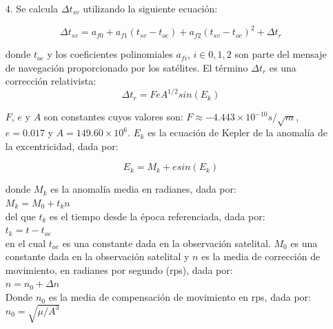 {\begin{itemize}
donde $c$ es la velocidad de la luz: $c \approx 2.998 \times 10^{8} ms^{-1}$.

\item[4.] Se calcula $\Delta t_{sv}$ utilizando la siguiente ecuación:

\begin{equation}
\label{Eq:Deltat_sv}
\Delta t_{sv}= a_{f0} + a_{f1}(t_{sv}-t_{oc}) + a_{f2}(t_{sv}-t_{oc})^2 + \Delta t_{r}
\end{equation}

donde $t_{oc}$ y los coeficientes polinomiales $a_{fi}$, $i \in {0, 1, 2}$ son parte del mensaje de navegación proporcionado por los satélites. El término $\Delta t_{r}$ es una corrección relativista:\\

\begin{equation}
\label{Eq:Deltat_r}
\Delta t_r = FeA^{1/2}sin(E_{k})
\end{equation}

$F$, $e$ y $A$ son constantes cuyos valores son: $F \approx -4.443 \times 10^{-10} s/\sqrt{m}$, $e = 0.017$ y $A = 149.60 \times 10^{6}$. $E_{k}$ es la ecuación de Kepler de la anomalía de la excentricidad, dada por:

\begin{equation}
\label{Eq:Kepler}
E_k = M_k + esin(E_k)
\end{equation}

donde $M_k$ es la anomalía media en radianes, dada por: \\

$M_k = M_0 + t_k n$\\

del que $t_k$ es el tiempo desde la época referenciada, dada por:\\

$t_k = t - t_{oe}$\\

en el cual $t_{oe}$ es una constante dada en la observación satelital. $M_0$ es una constante dada en la observación satelital y $n$ es la media de corrección de movimiento, en radianes por segundo (rps), dada por:\\

$n = n_0 + \Delta n$\\

Donde $n_0$ es la media de compensación de movimiento en rps, dada por:\\

$n_0 = \sqrt{\mu / A^{3}}$\\ 


\end{itemize}}
